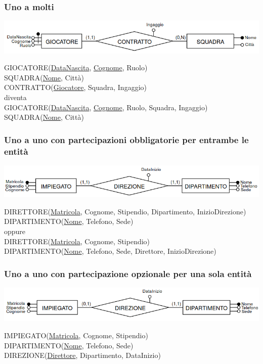 \documentclass[a4paper]{article}
\begin{document}
\subsubsection{Uno a molti}
\begin{center}
      \includegraphics[scale=0.44]{img/pl9.png}
\end{center}
%
GIOCATORE(\underline{DataNascita}, \underline{Cognome}, Ruolo)\\
SQUADRA(\underline{Nome}, Città)\\
CONTRATTO(\underline{Giocatore}, Squadra, Ingaggio)\medskip\\
%
diventa\medskip\\
%
GIOCATORE(\underline{DataNascita}, \underline{Cognome}, Ruolo, Squadra, Ingaggio)\\
SQUADRA(\underline{Nome}, Città)

\subsubsection{Uno a uno con partecipazioni obbligatorie per entrambe le entità}
\begin{center}
      \includegraphics[scale=0.44]{img/pl10.png}
\end{center}
%
DIRETTORE(\underline{Matricola}, Cognome, Stipendio, Dipartimento, InizioDirezione)\\
DIPARTIMENTO(\underline{Nome}, Telefono, Sede)\medskip\\
%
oppure\medskip\\
%
DIRETTORE(\underline{Matricola}, Cognome, Stipendio)\\
DIPARTIMENTO(\underline{Nome}, Telefono, Sede, Direttore, InizioDirezione)

\subsubsection{Uno a uno con partecipazione opzionale per una sola entità}
\begin{center}
      \includegraphics[scale=0.44]{img/pl11.png}
\end{center}
%
IMPIEGATO(\underline{Matricola}, Cognome, Stipendio)\\
DIPARTIMENTO(\underline{Nome}, Telefono, Sede)\\
DIREZIONE(\underline{Direttore}, Dipartimento, DataInizio)
\end{document}
